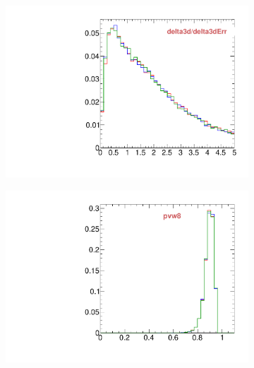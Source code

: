 \begin{figure}
\begin{subfigure}[b]{0.2\textwidth}
                \includegraphics[width=\textwidth]{Figures/VariablesComparison/Data_barrel_figs_3h/delta3d/delta3dErr}
                \label{fig:Data_barrel_delta3d/delta3dErr_3h}
        \end{subfigure}
        \begin{subfigure}[b]{0.2\textwidth}
                \centering
                \includegraphics[width=\textwidth]{Figures/VariablesComparison/Data_barrel_figs_3h/pvw8}
                \label{fig:Data_barrel_pvw8_3h}
        \end{subfigure}
        \begin{subfigure}[b]{0.2\textwidth}
                \centering

\end{subfigure}
\end{figure}
